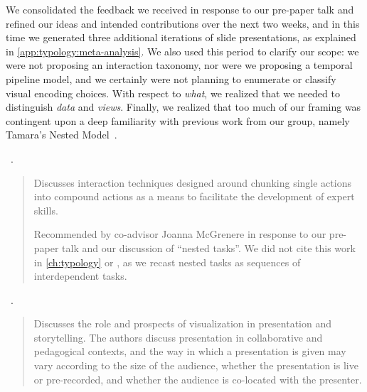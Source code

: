 
We consolidated the feedback we received in response to our pre-paper talk and refined our ideas and intended contributions over the next two weeks, and in this time we generated three additional iterations of slide presentations, as explained in \autoref{app:typology:meta-analysis}.
We also used this period to clarify our scope: we were not proposing an interaction taxonomy, nor were we proposing a temporal pipeline model, and we certainly were not planning to enumerate or classify visual encoding choices. 
With respect to {\it what}, we realized that we needed to distinguish {\it data} and {\it views}.
Finally, we realized that too much of our framing was contingent upon a deep familiarity with previous work from our group, namely Tamara's Nested Model~\cite{Munzner2009}.

\begin{sloppypar}
~\cite{Buxton1986}. \end{sloppypar}

\begin{quotation}
    Discusses interaction techniques designed around chunking single actions into compound actions as a means to facilitate the development of expert skills.
    
    Recommended by co-advisor Joanna McGrenere in response to our pre-paper talk and our discussion of ``nested tasks''. 
    We did not cite this work in \autoref{ch:typology} or \citet{Brehmer2013}, as we recast nested tasks as sequences of interdependent tasks.
\end{quotation}

\begin{sloppypar}
~\cite{Kosara2013}. \end{sloppypar}

\begin{quotation}
    Discusses the role and prospects of visualization in presentation and storytelling.
    The authors discuss presentation in collaborative and pedagogical contexts, and the way in which a presentation is given may vary according to the size of the audience, whether the presentation is live or pre-recorded, and whether the audience is co-located with the presenter.
\end{quotation}

